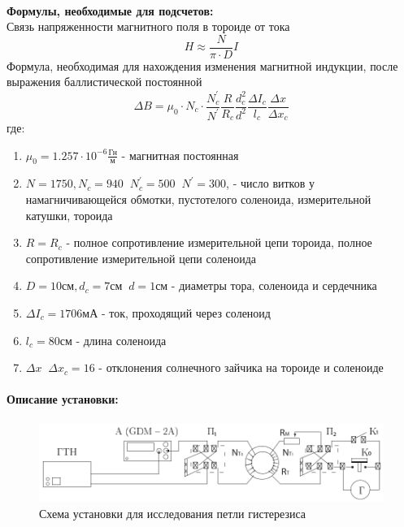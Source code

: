 \documentclass[a4paper,12pt]{article}
\begin{document}
\paragraph{} \textbf{Формулы, необходимые для подсчетов:\\}
Связь напряженности магнитного поля в тороиде от тока
\begin{equation}
H \approx \frac{N}{\pi\cdot D}I
\end{equation}
Формула, необходимая для нахождения изменения магнитной индукции, после выражения баллистической постоянной 
\begin{equation}
\Delta B = \mu_0 \cdot N_{c} \cdot \frac{N^{'}_{c}}{N^{'}} \frac{R}{R_{c}}\frac{d_{c}^2}{d^2} \frac{\Delta I_{c}}{l_{c}} \frac{\Delta x}{\Delta x_{c}}
\end{equation}
где:
\begin{enumerate}
\itemsep0em
\item $\mu_0 = 1.257 \cdot 10^{-6} \frac{\text{Гн}}{\text{м}}$ - магнитная постоянная
\item $N = 1750, N_{c} = 940\;\;N^{'}_{c} = 500\;\;N^{'} = 300$, - число витков у намагничивающейся обмотки, пустотелого соленоида, измерительной катушки, тороида
\item $R = R_{c}$ - полное сопротивление измерительной цепи тороида, полное сопротивление измерительной цепи соленоида
\item $D = 10 \text{см}, d_c =7\text{см} \;\; d = 1\text{см}$ - диаметры тора, соленоида и сердечника
\item $\Delta I_{c} = 1706 \text{мА}$ - ток, проходящий через соленоид
\item $l_{c} = 80\text{см}$ - длина соленоида 
\item $\Delta x\;\; \Delta x_{c} = 16$ - отклонения солнечного зайчика  на тороиде и соленоиде
\end{enumerate}
\paragraph{Описание установки:}
\paragraph{}
\begin{figure}[h!]
\includegraphics[scale=1]{ustanovka_1.pdf}
\caption{Схема установки для исследования петли гистерезиса}
\label{ustanovka_1}
\end{figure}
\end{document}
